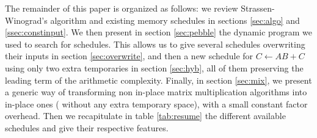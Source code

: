 \documentclass{article}
\begin{document}
The remainder of this paper is organized as follows: we review Strassen-Winograd's algorithm and existing memory schedules
in sections \ref{sec:algo} and \ref{ssec:constinput}. We then present in
section \ref{sec:pebble} the dynamic program we used to search for
schedules. This allows us to give several schedules overwriting their inputs in
section \ref{sec:overwrite}, and then a new schedule for $C \leftarrow
A B +C$ using only two extra temporaries in section \ref{sec:hyb}, all
of them preserving the leading term of the arithmetic complexity. 
Finally, in section \ref{sec:mix}, we present a generic way of transforming non in-place matrix
multiplication algorithms into in-place ones (\ie{} without any extra
temporary space), with a small constant
factor overhead. Then we recapitulate in table \ref{tab:resume} the
different available schedules and give their respective features.
\end{document}
